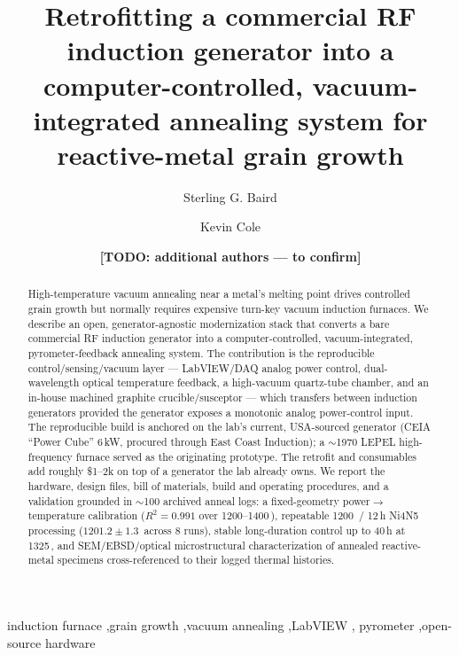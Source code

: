 \documentclass[5p,times]{elsarticle}
\newcommand{\todo}[1]{{\color{red}\textbf{[TODO: #1]}}}
\begin{document}
\begin{frontmatter}

\title{Retrofitting a commercial RF induction generator into a
computer-controlled, vacuum-integrated annealing system for reactive-metal
grain growth}

\author[byu]{Sterling G. Baird}
\author[byu]{Kevin Cole}
\author[byu]{\todo{additional authors --- to confirm}}


\begin{abstract}
High-temperature vacuum annealing near a metal's melting point drives controlled
grain growth but normally requires expensive turn-key vacuum induction furnaces.
We describe an open, generator-agnostic modernization stack that converts a bare
commercial RF induction generator into a computer-controlled, vacuum-integrated,
pyrometer-feedback annealing system. The contribution is the reproducible
control/sensing/vacuum layer --- LabVIEW/DAQ analog power control, dual-wavelength
optical temperature feedback, a high-vacuum quartz-tube chamber, and an in-house
machined graphite crucible/susceptor --- which transfers between induction
generators provided the generator exposes a monotonic analog power-control input.
The reproducible build is anchored on the lab's current, USA-sourced generator
(CEIA ``Power Cube'' 6\,kW, procured through East Coast Induction); a $\sim$1970
LEPEL high-frequency furnace served as the originating prototype. The retrofit and
consumables add roughly \$1--2k on top of a generator the lab already owns. We
report the hardware, design files, bill of materials, build and operating
procedures, and a validation grounded in $\sim$100 archived anneal logs: a fixed-geometry
power$\rightarrow$temperature calibration ($R^2 = 0.991$ over 1200--1400\,\celsius),
repeatable 1200\,\celsius{} / 12\,h Ni4N5 processing ($1201.2 \pm 1.3$\,\celsius{}
across 8 runs), stable long-duration control up to 40\,h at 1325\,\celsius, and
SEM/EBSD/optical microstructural characterization of annealed reactive-metal
specimens cross-referenced to their logged thermal histories.
\end{abstract}

\begin{keyword}
induction furnace \sep grain growth \sep vacuum annealing \sep LabVIEW \sep
pyrometer \sep open-source hardware
\end{keyword}

\end{frontmatter}
\end{document}
